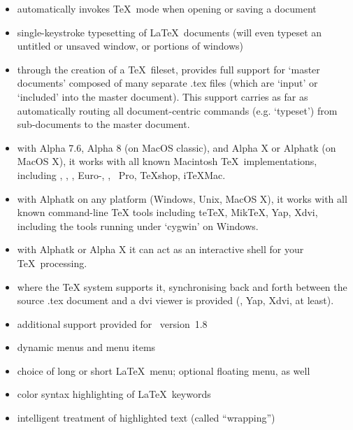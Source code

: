 \documentclass{report}
\begin{document}
\begin{itemize}
	\item automatically invokes \TeX\ mode when opening or saving a 
	 document

	\item single-keystroke typesetting of \LaTeX\ documents (will even 
	typeset an untitled or unsaved window, or portions of windows)

    \item through the creation of a \TeX\ fileset, provides full
    support for `master documents' composed of many separate .tex files
    (which are `input' or `included' into the master document).  This
    support carries as far as automatically routing all
    document-centric commands (e.g. `typeset') from sub-documents to
    the master document.
    
	\item with Alpha 7.6, Alpha 8 (on MacOS classic), and Alpha X
	or Alphatk (on MacOS X), it works with all known Macintosh \TeX\
	implementations, including \OzTeX, \Textures, \CMacTeX,
	Euro-\OzTeX, \DirectTeX, \DirectTeX~Pro, TeXshop, iTeXMac.

    \item with Alphatk on any platform (Windows, Unix,
    MacOS X), it works with all known command-line TeX tools
    including teTeX, MikTeX, Yap, Xdvi, including the tools
    running under `cygwin' on Windows.

    \item with Alphatk or Alpha X it can act as an interactive shell
    for your \TeX\ processing.
    
    \item where the TeX system supports it, synchronising back
    and forth between the source .tex document and a dvi viewer
    is provided (\Textures, Yap, Xdvi, at least).

	\item additional support provided for \Textures\ version~1.8

	\item dynamic menus and menu items
	
	\item choice of long or short \LaTeX\ menu; optional floating menu, 
	as well

	\item color syntax highlighting of \LaTeX\ keywords

	\item intelligent treatment of highlighted text (called ``wrapping'')


\end{itemize}
\end{document}
